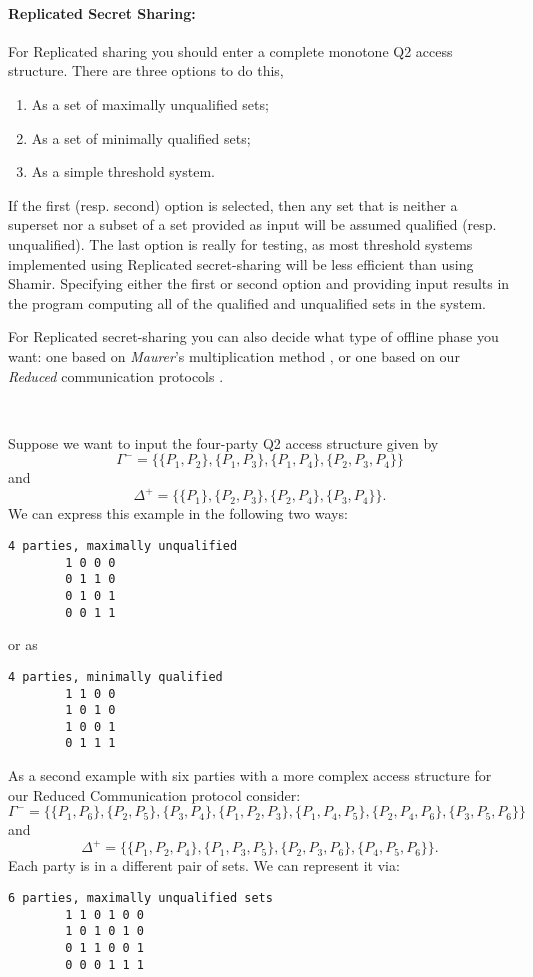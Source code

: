 \paragraph{Replicated Secret Sharing:}
For Replicated sharing you should enter a complete monotone Q2 access structure.
There are three options to do this, 
\begin{enumerate}
\item As a set of maximally unqualified sets;
\item As a set of minimally qualified sets;
\item As a simple threshold system.
\end{enumerate}
If the first (resp. second) option is selected, then any set that is neither 
a superset nor a subset of a set provided as input will be assumed qualified (resp. unqualified).
The last option is really for testing, as most 
threshold systems implemented using Replicated secret-sharing will be
less efficient than using Shamir.  
Specifying either the first or second option and providing input
results in the program computing all of the qualified and unqualified
sets in the system.  

For Replicated secret-sharing you
can also decide what type of offline phase you want: one based on
{\em Maurer}'s multiplication method \cite{Maurer}, 
or one based on our {\em Reduced} communication protocols \cite{KRSW}.

~~

\noindent
Suppose we want to input the four-party Q2 access structure given by
\[\Gamma^- = \{\{P_1, P_2\}, \{P_1, P_3\}, \{P_1, P_4\}, \{P_2, P_3, P_4\}\}\]
and
\[\Delta^+ = \{\{P_1\}, \{P_2, P_3\}, \{P_2, P_4\}, \{P_3, P_4\}\}.\]
We can express this example in the following two ways:
\begin{verbatim}
4 parties, maximally unqualified
        1 0 0 0
        0 1 1 0
        0 1 0 1
        0 0 1 1
\end{verbatim}
or as
\begin{verbatim}
4 parties, minimally qualified
        1 1 0 0
        1 0 1 0
        1 0 0 1
        0 1 1 1
\end{verbatim}

\noindent
As a second example with six parties with a more complex
access structure for our Reduced Communication protocol consider:
\[\Gamma^- = \{\{P_1, P_6\}, \{P_2, P_5\}, \{P_3, P_4\}, \{P_1, P_2, P_3\}, \{P_1,
  P_4, P_5\}, \{P_2, P_4, P_6\}, \{P_3, P_5, P_6\}\}\]
and
\[\Delta^+ = \{\{P_1, P_2, P_4\}, \{P_1, P_3, P_5\}, \{P_2, P_3, P_6\}, \{P_4, P_5, P_6\}\}.\]
Each party is in a different pair of sets.  We can represent it via:
\begin{verbatim}
6 parties, maximally unqualified sets
        1 1 0 1 0 0
        1 0 1 0 1 0
        0 1 1 0 0 1
        0 0 0 1 1 1
\end{verbatim}

